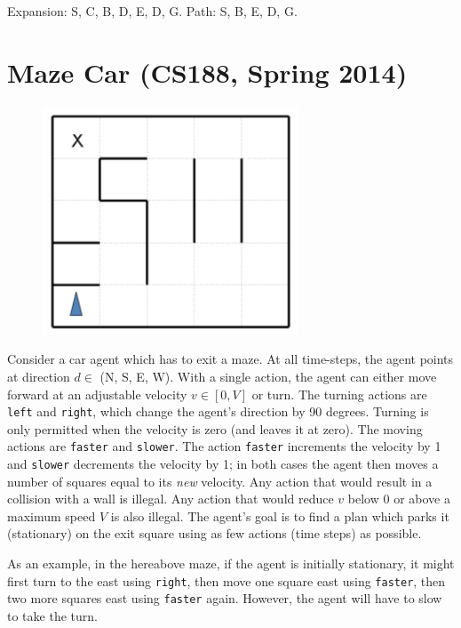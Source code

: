 \documentclass[11pt, a4paper]{article}
\begin{document}
\begin{enumerate}
\begin{solution}
        Expansion: S, C, B, D, E, D, G. Path: S, B, E, D, G.
    \end{solution}
\end{enumerate}

\newpage

\section{Maze Car (CS188, Spring 2014)}

\begin{figure}[h]
    \centering
    \includegraphics[width=0.3\linewidth]{figures/e1_maze.png}
\end{figure}

Consider a car agent which has to exit a maze. At all time-steps, the agent points at direction $d \in$ (N, S, E, W). With a single action, the agent can either move forward at an adjustable velocity $v \in [0, V]$ or turn. The turning actions are \texttt{left} and \texttt{right}, which change the agent's direction by 90 degrees. Turning is only permitted when the velocity is zero (and leaves it at zero). The moving actions are \texttt{faster} and \texttt{slower}. The action \texttt{faster} increments the velocity by 1 and \texttt{slower} decrements the velocity by 1; in both cases the agent then moves a number of squares equal to its \emph{new} velocity. Any action that would result in a collision with a wall is illegal. Any action that would reduce $v$ below 0 or above a maximum speed $V$ is also illegal. The agent's goal is to find a plan which parks it (stationary) on the exit square using as few actions (time steps) as possible.

As an example, in the hereabove maze, if the agent is initially stationary, it might first turn to the east using \texttt{right}, then move one square east using \texttt{faster}, then two more squares east using \texttt{faster} again. However, the agent will have to slow to take the turn.
\end{document}
